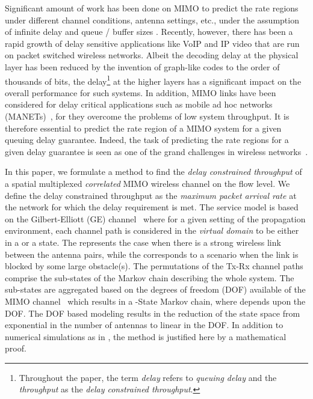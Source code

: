 \documentclass[10pt,conference]{IEEEtran}
\begin{document}
Significant amount of work has been done on MIMO to predict the rate regions under different channel conditions, antenna settings, etc.,
under the assumption of infinite delay and queue / buffer sizes \cite{MIMO:Teletar99:CapacityOfMultiAntennaGaus}.
Recently, however, there has been a rapid growth of delay sensitive applications like VoIP and IP video that are  run on packet switched wireless networks.
Albeit the decoding delay at the physical layer has been reduced by the invention of graph-like codes to the order of thousands of bits, the delay\footnote{Throughout the paper, the term \emph{delay} refers to \emph{queuing delay} and the \emph{throughput} as the \emph{delay constrained throughput}.}
at the higher layers has a significant impact on the overall performance for such systems.
In addition, MIMO links have been considered for delay critical applications such as mobile ad hoc networks (MANETs)~\cite{MIMO:Adhoc:Chen06}, for they overcome the problems of low system throughput.
It is therefore essential to predict the rate region of a MIMO system for a given queuing delay guarantee.
Indeed, the task of predicting the rate regions for a given delay guarantee is seen as one of the grand challenges in wireless networks~\cite{NIT:Jan08:RethinkingIT}.

In this paper, we formulate a method to find the \emph{delay constrained throughput} of a spatial multiplexed \emph{correlated} MIMO wireless channel on the flow level.
We define the delay constrained throughput as the \emph{maximum packet arrival rate} at the network for which the delay requirement is met.
The service model is based on the Gilbert-Elliott (GE) channel~\cite{WirelessMarkov:Gilbert60:CapacityBurstNoiseChannel, elliot_noise} where for a given setting of the propagation environment, each channel path is considered in the \emph{virtual domain}  \cite{MIMO:Correlated:Sayeed02:Deconstructing,MIMO:Veeravalli2005:CorrelatedMIMO:Variance}  to be either in a  or a  state.
The  represents the case when there is a strong wireless link between the antenna pairs, while the  corresponds to a scenario when the link is blocked by some large obstacle(s).
The permutations of the Tx-Rx channel paths comprise the sub-states of the Markov chain describing the whole system.
The sub-states are aggregated based on the degrees of freedom (DOF) available of the MIMO channel~\cite{MIMO:QoS:FSM:Kashif} which results in a -State Markov chain, where  depends upon the DOF.
The DOF based modeling results in the reduction of the state space from exponential in the number of antennas to linear in the DOF.
In addition to numerical simulations as in \cite{MIMO:QoS:FSM:Kashif}, the method is justified here by a mathematical proof.
\end{document}

